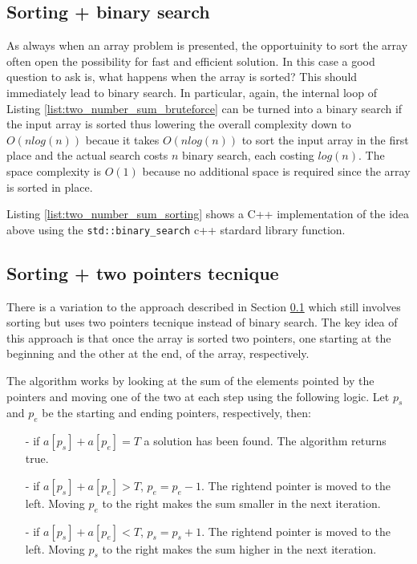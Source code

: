 \subsection{Sorting + binary search}
\label{sect:two_number_problem_binary_search}
As always when an array problem is presented, the opportuinity to sort the array often open the possibility for fast and efficient solution. 
In this case a good question to ask is, what happens when the array is sorted? This should immediately lead to binary search. In particular, again, the internal loop of Listing \ref{list:two_number_sum_bruteforce} can be turned into a binary search if the input array is sorted thus lowering the overall complexity down to $O(n log(n))$ becaue it takes $O(n log(n))$ to sort the input array in the first place and the actual search costs $n$ binary search, each costing $log(n)$.
The space complexity is $O(1)$ because no additional space is required since the array is sorted in place. 

Listing \ref{list:two_number_sum_sorting} shows a C++ implementation of the idea above using the \texttt{std::binary\_search} c++ stardard library function.





\subsection{Sorting + two pointers tecnique}
There is a variation to the approach described in Section \ref{sect:two_number_problem_binary_search} which still involves sorting but uses two pointers tecnique instead of binary search.
The key idea of this approach is that once the array is sorted two pointers, one starting at the beginning and the other at the end, of the array, respectively.

The algorithm works by looking at the sum of the elements pointed by the pointers and moving one of the two at each step using the following logic. Let $p_s$ and $p_e$ be the starting and ending pointers, respectively, then:
\begin{itemize}
	\item[-] if $a[p_s]+a[p_e] = T$ a solution has been found. The algorithm returns true.
	\item[-] if $a[p_s]+a[p_e] > T$, $p_e=p_e-1$. The rightend pointer is moved to the left. Moving $p_e$ to the right makes the sum smaller in the next iteration. 
	\item[-] if $a[p_s]+a[p_e] < T$, $p_s=p_s+1$. The rightend pointer is moved to the left. Moving $p_s$ to the right makes the sum higher in the next iteration. 
\end{itemize}

